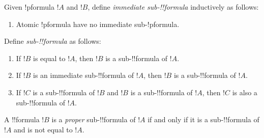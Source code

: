 \documentclass[../../include/open-logic-section]{subfiles}
\begin{document}
\begin{defn}
Given !p{formula} $!A$ and $!B$, define \emph{immediate sub-!!{formula}}
inductively as follows:
\begin{enumerate}
\item Atomic !p{formula} have no immediate sub-!p{formula}.







\end{enumerate}
\end{defn}


\begin{defn}
Define \emph{sub-!!{formula}} as follows:
\begin{enumerate}
\item If $!B$ is equal to $!A$, then $!B$ is a sub-!!{formula} of $!A$.
\item If $!B$ is an immediate sub-!!{formula} of $!A$, then $!B$ is a
  sub-!!{formula} of $!A$.
\item If $!C$ is a sub-!!{formula} of $!B$ and $!B$ is a sub-!!{formula} of
  $!A$, then $!C$ is also a sub-!!{formula} of $!A$.
\end{enumerate}
A !!{formula} $!B$ is a \emph{proper} sub-!!{formula} of $!A$ if and only if it
is a sub-!!{formula} of $!A$ and is not equal to $!A$.
\end{defn}

\end{document}
